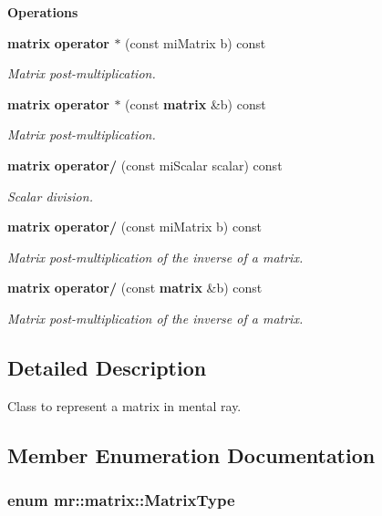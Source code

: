 \begin{Indent}{\bf Operations}
\begin{CompactItemize}
{\bf matrix} {\bf operator $\ast$} (const mi\-Matrix b) const 
\begin{CompactList}\small\item\em Matrix post-multiplication. \item\end{CompactList}\item 
{\bf matrix} {\bf operator $\ast$} (const {\bf matrix} \&b) const 
\begin{CompactList}\small\item\em Matrix post-multiplication. \item\end{CompactList}\item 
{\bf matrix} {\bf operator/} (const mi\-Scalar scalar) const 
\begin{CompactList}\small\item\em Scalar division. \item\end{CompactList}\item 
{\bf matrix} {\bf operator/} (const mi\-Matrix b) const 
\begin{CompactList}\small\item\em Matrix post-multiplication of the inverse of a matrix. \item\end{CompactList}\item 
{\bf matrix} {\bf operator/} (const {\bf matrix} \&b) const 
\begin{CompactList}\small\item\em Matrix post-multiplication of the inverse of a matrix. \item\end{CompactList}\end{CompactItemize}
\end{Indent}


\subsection{Detailed Description}
Class to represent a matrix in mental ray. 



\subsection{Member Enumeration Documentation}
\subsubsection{\setlength{\rightskip}{0pt plus 5cm}enum {\bf mr::matrix::Matrix\-Type}}\label{classmr_1_1matrix_z18_0}


